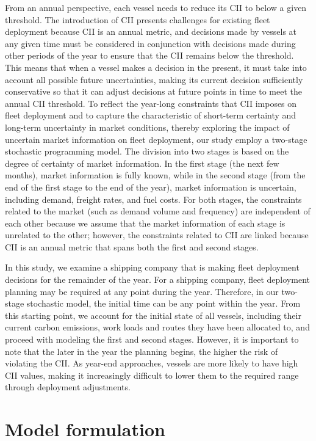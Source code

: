 \documentclass[11pt,english]{article}
\begin{document}
From an annual perspective, each vessel needs to reduce its CII to below a given threshold. The introduction of CII presents challenges for existing fleet deployment because CII is an annual metric, and decisions made by vessels at any given time must be considered in conjunction with decisions made during other periods of the year to ensure that the CII remains below the threshold. This means that when a vessel makes a decision in the present, it must take into account all possible future uncertainties, making its current decision sufficiently conservative so that it can adjust decisions at future points in time to meet the annual CII threshold. To reflect the year-long constraints that CII imposes on fleet deployment and to capture the characteristic of short-term certainty and long-term uncertainty in market conditions, thereby exploring the impact of uncertain market information on fleet deployment, our study employ a two-stage stochastic programming model. The division into two stages is based on the degree of certainty of market information. In the first stage (the next few months), market information is fully known, while in the second stage (from the end of the first stage to the end of the year), market information is uncertain, including demand, freight rates, and fuel costs. For both stages, the constraints related to the market (such as demand volume and frequency) are independent of each other because we assume that the market information of each stage is unrelated to the other; however, the constraints related to CII are linked because CII is an annual metric that spans both the first and second stages.

In this study, we examine a shipping company that is making fleet deployment decisions for the remainder of the year. For a shipping company, fleet deployment planning may be required at any point during the year. Therefore, in our two-stage stochastic model, the initial time can be any point within the year. From this starting point, we account for the initial state of all vessels, including their current carbon emissions, work loads and routes they have been allocated to, and proceed with modeling the first and second stages. However, it is important to note that the later in the year the planning begins, the higher the risk of violating the CII. As year-end approaches, vessels are more likely to have high CII values, making it increasingly difficult to lower them to the required range through deployment adjustments.

\section{Model formulation}
\label{sec:model_formulation}
\end{document}
